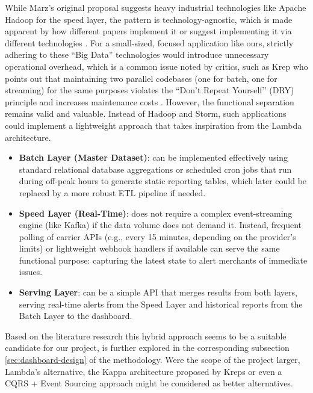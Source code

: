 \documentclass{imc-inf}
\begin{document}
While Marz's original proposal suggests heavy industrial technologies like Apache Hadoop for the speed layer, the pattern is technology-agnostic, which is made apparent by how different papers implement it or suggest implementing it via different technologies \cite{lekkalaLeveragingLambdaArchitecture2020, hasaniLambdaArchitectureReal2014}.
For a small-sized, focused application like ours, strictly adhering to these “Big Data” technologies would introduce unnecessary operational overhead, which is a common issue noted by critics, such as Krep who points out that maintaining two parallel codebases (one for batch, one for streaming) for the same purposes violates the “Don't Repeat Yourself” (DRY) principle and increases maintenance costs \cite{krepsQuestioningLambdaArchitecture2014}.
However, the functional separation remains valid and valuable. Instead of Hadoop and Storm, such applications could implement a lightweight approach that takes inspiration from the Lambda architecture.

\begin{itemize}[itemsep=3pt]
  \item \textbf{Batch Layer (Master Dataset)}: can be implemented effectively using standard relational database aggregations or scheduled cron jobs that run during off-peak hours to generate static reporting tables, which later could be replaced by a more robust ETL pipeline if needed.
  \item \textbf{Speed Layer (Real-Time)}: does not require a complex event-streaming engine (like Kafka) if the data volume does not demand it. Instead, frequent polling of carrier APIs (e.g., every 15 minutes, depending on the provider's limits) or lightweight webhook handlers if available can serve the same functional purpose: capturing the latest state to alert merchants of immediate issues.
  \item \textbf{Serving Layer}: can be a simple API that merges results from both layers, serving real-time alerts from the Speed Layer and historical reports from the Batch Layer to the dashboard.
\end{itemize}

Based on the literature research this hybrid approach seems to be a suitable candidate for our project, is further explored in the corresponding subsection \ref{sec:dashboard-design} of the methodology.
Were the scope of the project larger, Lambda's alternative, the Kappa architecture proposed by Kreps \cite{krepsQuestioningLambdaArchitecture2014} or even a CQRS + Event Sourcing approach \cite{pachecoMicroservicePatternsBest2018} might be considered as better alternatives.
\end{document}
